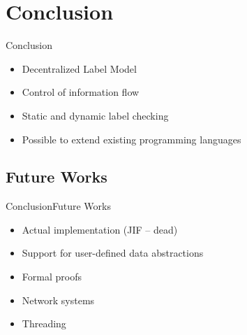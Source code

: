 \documentclass[10pt]{beamer}
\begin{document}
\section{Conclusion}
\begin{frame}{Conclusion}{}
	\begin{itemize}
		\item <1-> Decentralized Label Model
		\item <2-> Control of information flow
		\item <3-> Static and dynamic label checking
		\item <4-> Possible to extend existing programming languages
	\end{itemize}
\end{frame}

\subsection{Future Works}
\begin{frame}{Conclusion}{Future Works}
	\begin{itemize}
		\item <1-> Actual implementation (JIF -- dead)
		\item <2-> Support for user-defined data abstractions
		\item <3-> Formal proofs
		\item <4-> Network systems
		\item <5-> Threading
	\end{itemize}
\end{frame}

{\aauwavesbg
\begin{frame}
\end{frame}}
\end{document}
